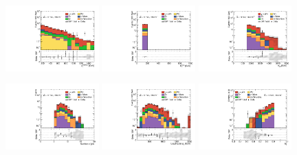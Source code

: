 \begin{figure}[ht!]
  \begin{center}

    \includegraphics[width=0.32\textwidth]{images_tmp/results/fr2/can_VRM1L_ph_pt0_afterFit.pdf}
    \includegraphics[width=0.32\textwidth]{images_tmp/results/fr2/can_VRM1L_met_et_afterFit.pdf}
    \includegraphics[width=0.32\textwidth]{images_tmp/results/fr2/can_VRM1L_meff_afterFit.pdf}

    \includegraphics[width=0.32\textwidth]{images_tmp/results/fr2/can_VRM1L_jet_n_afterFit}
    \includegraphics[width=0.32\textwidth]{images_tmp/results/fr2/can_VRM1L_jet_pt0_afterFit.pdf}
    \includegraphics[width=0.32\textwidth]{images_tmp/results/fr2/can_VRM1L_rt4_afterFit}


\end{center}
\end{figure}
